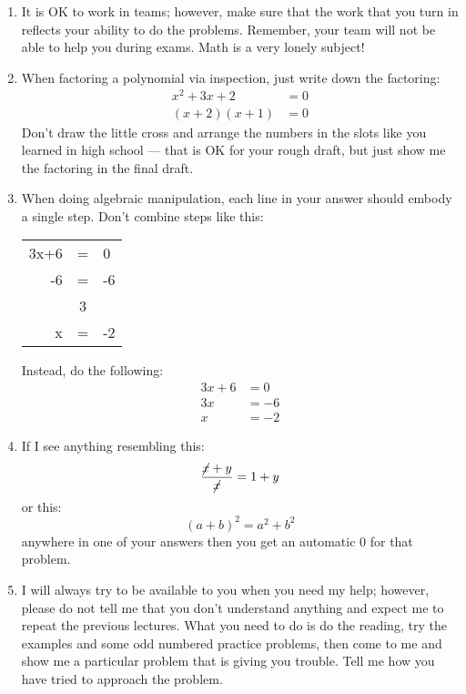 \documentclass[letterpaper,12pt,fleqn]{article}
\begin{document}
\begin{enumerate}
\item It is OK to work in teams; however, make sure that the work that you turn in reflects your ability to do the
  problems. Remember, your team will not be able to help you during exams. Math is a very lonely subject!

\item When factoring a polynomial via inspection, just write down the factoring:
\begin{align*}
x^2+3x+2 &= 0 \\
(x+2)(x+1) &= 0
\end{align*}
Don't draw the little cross and arrange the numbers in the slots like you
learned in high school --- that is OK for your rough draft, but just show me
the factoring in the final draft.

\item When doing algebraic manipulation, each line in your answer should
  embody a single step. Don't combine steps like this:

\begin{tabular}{rcl}
3x+6 & = & 0 \\
-6 & = & -6 \\
\hline
 & 3 & \\
x & = & -2
\end{tabular}

Instead, do the following:
\begin{align*}
3x+6 &= 0 \\
3x &= -6 \\
x &= -2
\end{align*}


\item If I see anything resembling this:
  \[\frac{\cancel{x}+y}{\cancel{x}} = 1+y\]
  or this:
  \[(a+b)^2=a^2+b^2\]
  anywhere in one of your answers then you get an automatic 0 for that problem.

\item I will always try to be available to you when you need my help; however, please do not tell me that you don't understand
  anything and expect me to repeat the previous lectures.  What you need to do is do the reading, try the examples and some
  odd numbered practice problems, then come to me and show me a particular problem that is giving you trouble. Tell me how you
  have tried to approach the problem.
\end{enumerate}
\end{document}
